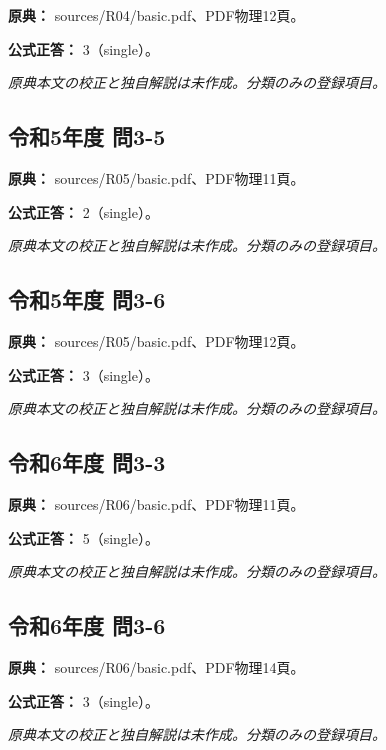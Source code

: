 \noindent\textbf{原典：} sources/R04/basic.pdf、PDF物理12頁。

\textbf{公式正答：} 3（single）。

\par\textit{原典本文の校正と独自解説は未作成。分類のみの登録項目。}

\subsection{令和5年度 問3-5}
\label{q:r05-reg-basic-3-5}

\noindent\textbf{原典：} sources/R05/basic.pdf、PDF物理11頁。

\textbf{公式正答：} 2（single）。

\par\textit{原典本文の校正と独自解説は未作成。分類のみの登録項目。}

\subsection{令和5年度 問3-6}
\label{q:r05-reg-basic-3-6}

\noindent\textbf{原典：} sources/R05/basic.pdf、PDF物理12頁。

\textbf{公式正答：} 3（single）。

\par\textit{原典本文の校正と独自解説は未作成。分類のみの登録項目。}

\subsection{令和6年度 問3-3}
\label{q:r06-reg-basic-3-3}

\noindent\textbf{原典：} sources/R06/basic.pdf、PDF物理11頁。

\textbf{公式正答：} 5（single）。

\par\textit{原典本文の校正と独自解説は未作成。分類のみの登録項目。}

\subsection{令和6年度 問3-6}
\label{q:r06-reg-basic-3-6}

\noindent\textbf{原典：} sources/R06/basic.pdf、PDF物理14頁。

\textbf{公式正答：} 3（single）。

\par\textit{原典本文の校正と独自解説は未作成。分類のみの登録項目。}


